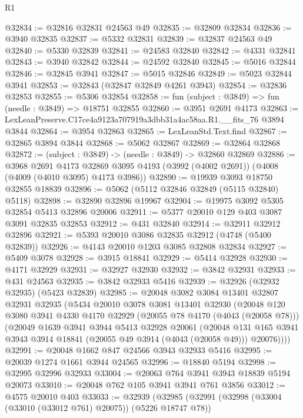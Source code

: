 \begin{lexlean}{R1}
\begin{coremodule}
@32834 := @32816 @32831 @24563 @49
@32835 := @32809 @32834
@32836 := @3940 @32835
@32837 := @5332 @32831
@32839 := @32837 @24563 @49
@32840 := @5330 @32839
@32841 := @24583 @32840
@32842 := @4331 @32841
@32843 := @3940 @32842
@32844 := @24592 @32840
@32845 := @5016 @32844
@32846 := @32845 @3941
@32847 := @5015 @32846
@32849 := @5023 @32844 @3941
@32853 := @32843 (@32847 @32849 @4261 @3943)
@32854 := @32836 @32853
@32855 := @5306 @32854
@32858 := fun (subject : @3849) => fun (needle : @3849) => @18751 @32855
@32860 := @3951 @2691 @4173
@32863 := LexLeanPreserve.C17ce4a9123a707919a3dbb31a4ac58aa.R1.__fits_76 @3894 @3844
@32864 := @3954 @32863
@32865 := LexLeanStd.Text.find
@32867 := @32865 @3894 @3844
@32868 := @5062 @32867
@32869 := @32864 @32868
@32872 := (subject : @3849) -> (needle : @3849) -> @32860 @32869
@32886 := @3968
    @2691
    @4173
    @32869
    @3095
    @4193
    (@3992 (@4002 @2691))
    (@4008 (@4009 (@4010 @3095) @4173 @3986))
@32890 := @19939 @3093 @18750 @32855 @18839
@32896 := @5062 (@5112 @32846 @32849 (@5115 @32840) @5118)
@32898 := @32890 @32896 @19967
@32904 := @19975 @3092 @5305 @32854 @5413 @32896 @20006
@32911 := @5377 @20010 @129 @403 @3087 @3091 @32835 @32853
@32912 := @431 @32840
@32914 := @32911 @32912 @32896
@32921 := @5393 @20010 @3086 @32835 @32912 (@4748 (@5400 @32839))
@32926 := @4143 @20010 @1203 @3085 @32808 @32834
@32927 := @5409 @3078
@32928 := @3915 @18841
@32929 := @5414 @32928
@32930 := @4171 @32929
@32931 := @32927 @32930
@32932 := @3842 @32931
@32933 := @431 @24563
@32935 := @3842 @32933 @5416
@32939 := @32926 (@32932 @32935) (@5423 @32839)
@32985 := @20048
    @3082
    @3084
    @13401
    @32807
    @32931
    @32935
    (@5434
      @20010
      @3078
      @3081
      @13401
      @32930
      (@20048
        @120
        @3080
        @3941
        @4330
        @4170
        @32929
        (@20055 @78 @4170 (@4043 (@20058 @78)))
        (@20049
          @1639
          @3941
          @3944
          @5413
          @32928
          @20061
          (@20048
            @131
            @165
            @3941
            @3943
            @3914
            @18841
            (@20055 @49 @3914 (@4043 (@20058 @49)))
            @20076))))
@32991 := @20048 @1662 @847 @24566 @3943 @32933 @5416
@32995 := @20039 @1274 @1661 @3944 @24565
@32996 := @18840 @5194
@32998 := @32995 @32996 @32933
@33004 := @20063 @764 @3941 @3943 @18839 @5194 @20073
@33010 := @20048 @762 @105 @3941 @3941 @761 @3856
@33012 := @4575 @20010 @403
@33033 := @32939
    (@32985
      (@32991
        (@32998 (@33004 (@33010 (@33012 @761) @20075)) (@5226 @18747 @78))

\end{coremodule}
\end{lexlean}
